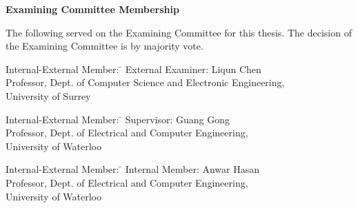 \pagestyle{plain}
\setcounter{page}{2}

\cleardoublepage %
 
\begin{center}\textbf{Examining Committee Membership}\end{center}
  \noindent
The following served on the Examining Committee for this thesis. The decision of the Examining Committee is by majority vote.
  \bigskip
  
  \noindent
\begin{tabbing}
Internal-External Member: \=  \kill %
External Examiner: \>  Liqun Chen \\ 
\> Professor, Dept. of Computer Science and Electronic Engineering,\\
\> University of Surrey \\
\end{tabbing} 
  \bigskip
  
  \noindent
\begin{tabbing}
Internal-External Member: \=  \kill %
Supervisor: \> Guang Gong \\
\> Professor, Dept. of Electrical and Computer Engineering,\\
\> University of Waterloo \\

\end{tabbing}
  \bigskip
  
  \noindent
  \begin{tabbing}
Internal-External Member: \=  \kill %
Internal Member: \> Anwar Hasan\\
\> Professor, Dept. of Electrical and Computer Engineering,\\
\> University of Waterloo \\
\end{tabbing}
  \bigskip

